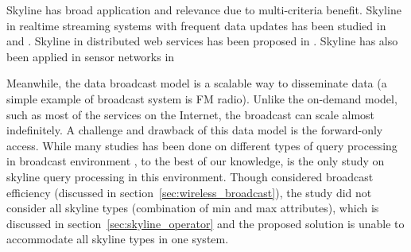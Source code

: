 \documentclass{sig-alternate}
\begin{document}
Skyline has broad application and relevance due to multi-criteria benefit.
Skyline in realtime streaming systems with frequent data updates has been
studied in \cite{Lin05stabbingthe} and \cite{Tao06maintainingsliding}.
Skyline in distributed web services has been proposed in
\cite{Balke04efficientdistributed}.
Skyline has also been applied in sensor networks in
\cite{Seong:2009:ESQ:1644993.1645022}

Meanwhile, the data broadcast model is a scalable way to disseminate data
(a simple example of broadcast system is FM radio).
Unlike the on-demand model, such as most of the services on the Internet,
the broadcast can scale almost indefinitely. A challenge and drawback of
this data model is the forward-only access. While many studies has been
done on different types of query processing in broadcast environment
\cite{DBLP:journals/tmc/KuZW08}\cite{dsi}\cite{DBLP:conf/cikm/Hara02},
to the best of our knowledge, \cite{Ha:2009:EEP:1616994.1617050} is the
only study on skyline query processing in this environment.
Though \cite{Ha:2009:EEP:1616994.1617050} considered broadcast
efficiency (discussed in section~\ref{sec:wireless_broadcast}), the study
did not consider all skyline types (combination of min and max attributes),
which is discussed in section~\ref{sec:skyline_operator} and the proposed
solution is unable to accommodate all skyline types in one system.


\end{document}
